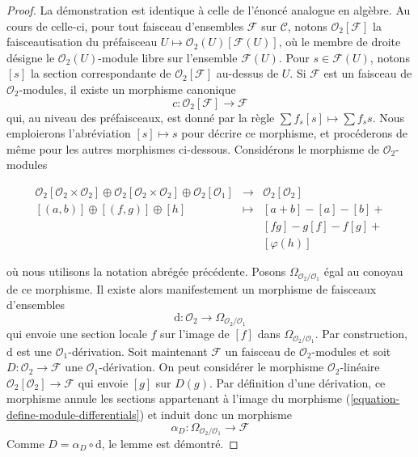 \begin{proof}

La démonstration est identique à celle de l'énoncé analogue en algèbre.
Au cours de celle-ci, pour tout faisceau d'ensembles $\mathcal{F}$ sur
$\mathcal{C}$, notons $\mathcal{O}_2[\mathcal{F}]$ la faisceautisation du
préfaisceau $U \mapsto \mathcal{O}_2(U)[\mathcal{F}(U)]$, où le membre de
droite désigne le $\mathcal{O}_2(U)$-module libre sur l'ensemble
$\mathcal{F}(U)$. Pour $s \in \mathcal{F}(U)$, notons $[s]$ la section
correspondante de $\mathcal{O}_2[\mathcal{F}]$ au-dessus de $U$. Si
$\mathcal{F}$ est un faisceau de $\mathcal{O}_2$-modules, il existe un
morphisme canonique
$$
c : \mathcal{O}_2[\mathcal{F}] \longrightarrow \mathcal{F}
$$
qui, au niveau des préfaisceaux, est donné par la règle
$\sum f_s[s] \mapsto \sum f_s s$. Nous emploierons l'abréviation
$[s] \mapsto s$ pour décrire ce morphisme, et procéderons de même pour les
autres morphismes ci-dessous. Considérons le morphisme de
$\mathcal{O}_2$-modules

\begin{equation}
\label{equation-define-module-differentials}
\begin{matrix}
\mathcal{O}_2[\mathcal{O}_2 \times  \mathcal{O}_2] \oplus
\mathcal{O}_2[\mathcal{O}_2 \times  \mathcal{O}_2] \oplus
\mathcal{O}_2[\mathcal{O}_1] &
\longrightarrow &
\mathcal{O}_2[\mathcal{O}_2] \\
[(a, b)] \oplus [(f, g)] \oplus [h] & \longmapsto & [a + b] - [a] - [b] + \\
& & [fg] - g[f] - f[g] + \\
& & [\varphi(h)]
\end{matrix}
\end{equation}

où nous utilisons la notation abrégée précédente. Posons
$\Omega_{\mathcal{O}_2/\mathcal{O}_1}$ égal au conoyau de ce morphisme. Il
existe alors manifestement un morphisme de faisceaux d'ensembles
$$
\text{d} : \mathcal{O}_2 \longrightarrow \Omega_{\mathcal{O}_2/\mathcal{O}_1}
$$
qui envoie une section locale $f$ sur l'image de $[f]$ dans
$\Omega_{\mathcal{O}_2/\mathcal{O}_1}$. Par construction, $\text{d}$ est une
$\mathcal{O}_1$-dérivation. Soit maintenant $\mathcal{F}$ un faisceau de
$\mathcal{O}_2$-modules et soit $D : \mathcal{O}_2 \to \mathcal{F}$ une
$\mathcal{O}_1$-dérivation. On peut considérer le morphisme
$\mathcal{O}_2$-linéaire $\mathcal{O}_2[\mathcal{O}_2] \to \mathcal{F}$ qui
envoie $[g]$ sur $D(g)$. Par définition d'une dérivation, ce morphisme annule
les sections appartenant à l'image du morphisme
(\ref{equation-define-module-differentials}) et induit donc un morphisme
$$
\alpha_D : \Omega_{\mathcal{O}_2/\mathcal{O}_1} \longrightarrow \mathcal{F}
$$
Comme $D = \alpha_D \circ \text{d}$, le lemme est démontré.

\end{proof}

